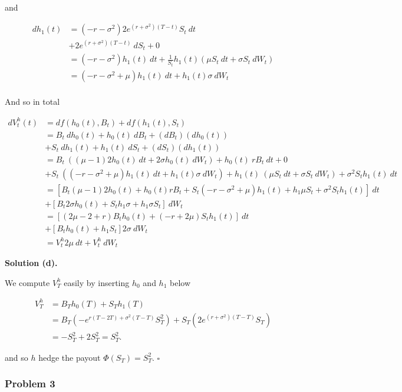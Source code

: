 \documentclass[
]{article}
\begin{document}
and

\begin{align*}
dh_1(t)&=(-r-\sigma^2)2e^{(r+\sigma^2)(T-t)}S_t\ dt\\
&+2e^{(r+\sigma^2)(T-t)}\ dS_t+0\\
&=(-r-\sigma^2)h_1(t)\ dt+\frac{1}{S_t}h_1(t)(\mu S_t\ dt+\sigma S_t\ dW_t)\\
&=(-r-\sigma^2+\mu)h_1(t)\ dt+h_1(t)\sigma \ dW_t\\
\end{align*}

And so in total

\begin{align*}
dV_t^h(t)&=df(h_0(t),B_t)+df(h_1(t),S_t)\\
&=B_t\ dh_0(t)+h_0(t)\ dB_t+(dB_t)(dh_0(t))\\
&+S_t\ dh_1(t)+h_1(t)\ dS_t+(dS_t)(dh_1(t))\\
&=B_t\ ((\mu-1)2h_0(t)\ dt+2\sigma h_0(t)\ dW_t)+h_0(t)\ rB_t\ dt+0\\
&+S_t\ ((-r-\sigma^2+\mu)h_1(t)\ dt+h_1(t)\sigma \ dW_t)+h_1(t)\ (\mu S_t\ dt+\sigma S_t\ dW_t)+\sigma^2S_th_1(t)\ dt\\
&=\left[B_t(\mu-1)2h_0(t)+h_0(t)rB_t+S_t(-r-\sigma^2+\mu)h_1(t)+h_1\mu S_t+\sigma^2S_th_1(t)\right]\ dt\\
&+\left[B_t2\sigma h_0(t)+S_th_1\sigma+h_1\sigma S_t\right]\ dW_t\\
&=\left[(2\mu-2+r)B_th_0(t)+(-r+2\mu)S_th_1(t)\right]\ dt\\
&+\left[B_t h_0(t)+h_1 S_t\right]2\sigma\ dW_t\\
&=V_t^h2\mu\ dt+V_t^h\ dW_t
\end{align*}

\textbf{Solution (d).}

We compute \(V_T^h\) easily by inserting \(h_0\) and \(h_1\) below

\begin{align*}
V_T^h&=B_Th_0(T)+S_Th_1(T)\\
&=B_T\left(-e^{r(T-2T)+\sigma^2(T-T)}S_T^2\right)+S_T\left(2e^{(r+\sigma^2)(T-T)}S_T\right)\\
&=-S_T^2+2S_T^2=S_T^2.
\end{align*}

and so \(h\) hedge the payout \(\Phi(S_T)=S_T^2\). \(\square\)

\hypertarget{problem-3-1}{%
\subsubsection{Problem 3}\label{problem-3-1}}
\end{document}
